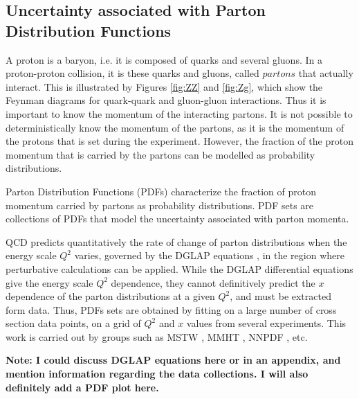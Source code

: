 \documentclass[11pt,a4paper,openright,twoside]{report}
\begin{document}
\subsection{Uncertainty associated with Parton Distribution Functions}
A proton is a baryon, i.e. it is composed of quarks and several gluons. In a proton-proton collision, it is these quarks and gluons, called $partons$ that actually interact. This is illustrated by Figures \ref{fig:ZZ} and \ref{fig:Zg}, which show the Feynman diagrams for quark-quark and gluon-gluon interactions. Thus it is important to know the momentum of the interacting partons. It is not possible to deterministically know the momentum of the partons, as it is the momentum of the protons that is set during the experiment. However, the fraction of the proton momentum that is carried by the partons can be modelled as probability distributions.

Parton Distribution Functions (PDFs) characterize the fraction of proton momentum carried by partons as probability distributions. PDF sets are collections of PDFs that model the uncertainty associated with parton momenta. 

QCD predicts quantitatively the rate of change of parton distributions when the energy scale $Q^2$ varies, governed by the DGLAP equations \cite{DGLAP}, in the region where perturbative calculations can be applied. While the DGLAP differential equations give the energy scale $Q^2$ dependence, they cannot definitively predict the $x$ dependence of the parton distributions at a given $Q^2$, and must be extracted form data. Thus, PDFs sets are obtained by fitting on a large number of cross section data points, on a grid of $Q^2$ and $x$ values from several experiments. This work is carried out by groups such as  MSTW \cite{MSTW, MSTW2, MSTW3}, MMHT \cite{MMHT14}, NNPDF \cite{NNPDF}, etc.

\textbf{Note: I could discuss DGLAP equations here or in an appendix, and mention information regarding the data collections. I will also definitely add a PDF plot here.}
\end{document}
